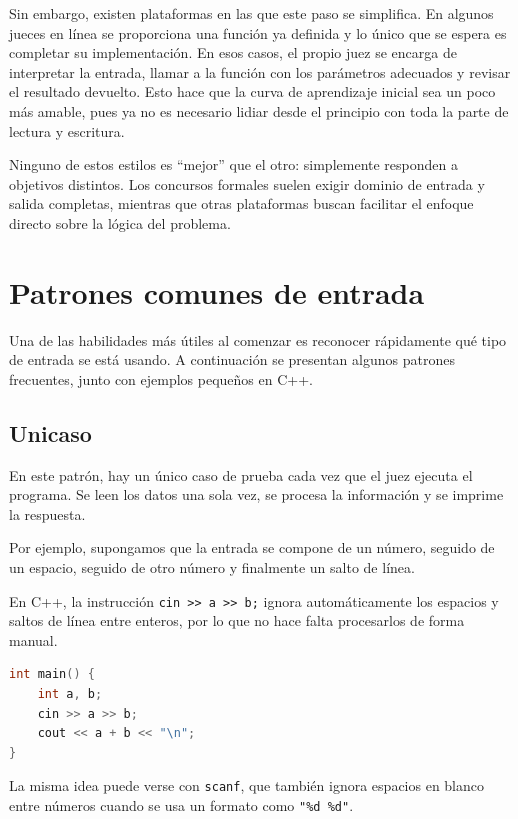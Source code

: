 Sin embargo, existen plataformas en las que este paso se simplifica. En algunos jueces en línea se proporciona una función ya definida y lo único que se espera es completar su implementación. En esos casos, el propio juez se encarga de interpretar la entrada, llamar a la función con los parámetros adecuados y revisar el resultado devuelto. Esto hace que la curva de aprendizaje inicial sea un poco más amable, pues ya no es necesario lidiar desde el principio con toda la parte de lectura y escritura.

Ninguno de estos estilos es ``mejor'' que el otro: simplemente responden a objetivos distintos. Los concursos formales suelen exigir dominio de entrada y salida completas, mientras que otras plataformas buscan facilitar el enfoque directo sobre la lógica del problema.

\section{Patrones comunes de entrada}

Una de las habilidades más útiles al comenzar es reconocer rápidamente qué tipo de entrada se está usando. A continuación se presentan algunos patrones frecuentes, junto con ejemplos pequeños en C++.

\subsection{Unicaso}

En este patrón, hay un único caso de prueba cada vez que el juez ejecuta el programa. Se leen los datos una sola vez, se procesa la información y se imprime la respuesta.

Por ejemplo, supongamos que la entrada se compone de un número, seguido de un espacio, seguido de otro número y finalmente un salto de línea.


En C++, la instrucción \verb|cin >> a >> b;| ignora automáticamente los espacios y saltos de línea entre enteros, por lo que no hace falta procesarlos de forma manual. 

\begin{lstlisting}[language=C++]
int main() {
    int a, b;
    cin >> a >> b;
    cout << a + b << "\n";
}
\end{lstlisting}

La misma idea puede verse con \texttt{scanf}, que también ignora espacios en blanco entre números cuando se usa un formato como \texttt{"\%d \%d"}.

